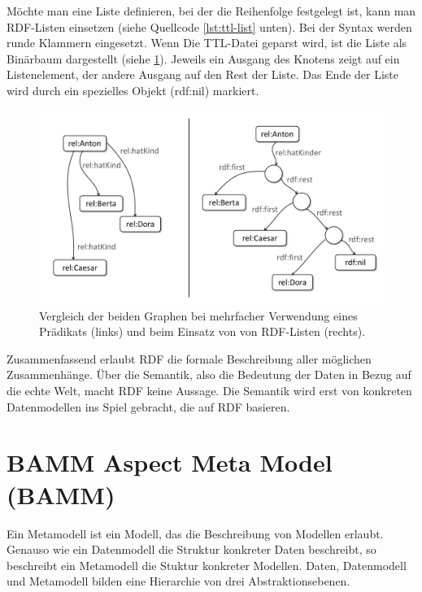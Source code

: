 		Möchte man eine Liste definieren, bei der die Reihenfolge festgelegt ist, kann man RDF-Listen einsetzen (siehe Quellcode \ref{lst:ttl-list} unten). Bei der Syntax werden runde Klammern eingesetzt. Wenn Die TTL-Datei geparst wird, ist die Liste als Binärbaum dargestellt (siehe \ref{fig:rdflist}). Jeweils ein Ausgang des Knotens zeigt auf ein Listenelement, der andere Ausgang auf den Rest der Liste. Das Ende der Liste wird durch ein spezielles Objekt (rdf:nil) markiert.

\begin{figure}
	\centering
	\includegraphics[width=0.7\linewidth]{resources/figures/rdfList}
	\caption[Vergleich von Merhfachverwendung eines Prädikats und RDF-Listen]{Vergleich der beiden Graphen bei mehrfacher Verwendung eines Prädikats (links) und beim Einsatz von von RDF-Listen (rechts).}
	\label{fig:rdflist}
\end{figure}

Zusammenfassend erlaubt RDF die formale Beschreibung aller möglichen Zusammenhänge. Über die Semantik, also die Bedeutung der Daten in Bezug auf die echte Welt, macht RDF keine Aussage. Die Semantik wird erst von konkreten Datenmodellen  ins Spiel gebracht, die auf RDF basieren.

\section{BAMM Aspect Meta Model (BAMM)}

Ein Metamodell ist ein Modell, das die Beschreibung von Modellen erlaubt. \cite[vgl.][S. 43f]{jeusfeld2009metamodel} Genauso wie ein Datenmodell die Struktur konkreter Daten beschreibt, so beschreibt ein Metamodell die Stuktur konkreter Modellen. Daten, Datenmodell und Metamodell bilden eine Hierarchie von drei Abstraktionsebenen.

